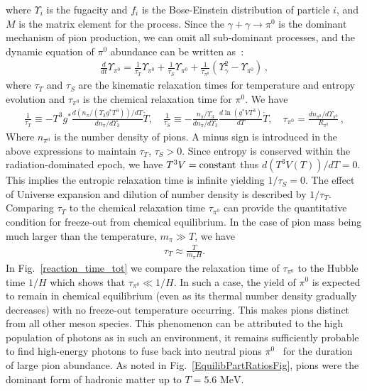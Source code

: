 \documentclass[universe,article,submit,moreauthors,pdftex,a4paper]{Definitions/mdpi}
\newcommand{\MeV}{\text{ MeV}}
\newcommand*{\rf}[1]{Fig.~{\ref{#1}}}
\begin{document}
where $\Upsilon_i$ is the fugacity and $f_{i}$ is the Bose-Einstein distribution of particle $i$, and $M$ is the matrix element for the process. Since the $\gamma+\gamma\to \pi^0$ is the dominant mechanism of pion production, we can omit all sub-dominant processes, and the dynamic equation of $\pi^0$ abundance can be written as~\cite{Fromerth:2012fe}:
\begin{align}
\frac{d}{dt}\Upsilon_{\pi^0}=\frac{1}{\tau_T}\Upsilon_{\pi^0}+\frac{1}{\tau_S}\Upsilon_{\pi^0}+\frac{1}{\tau_{\pi^0}}\left(\Upsilon^2_\gamma-\Upsilon_{\pi^0}\right)\,,
\end{align}
where $\tau_T$ and $\tau_S$ are the kinematic relaxation times for temperature and entropy evolution and $\tau_{\pi^0}$ is the chemical relaxation time for $\pi^0$. We have
\begin{align}
\frac{1}{\tau_T}\equiv -T^3g^*\frac{d (n_{\pi}/(\Upsilon_3
g^*T^3))/dT}{dn_{\pi}/d{\Upsilon_3}}{\dot T},\label{tauT} \quad
\frac{1}{\tau_{S}}\equiv
-\frac{n_{\pi}/\Upsilon_3}{dn_{\pi}/d{\Upsilon_3}}\frac{d\ln (g^*VT^3)}{dT}
\dot{T},\quad
\tau_{\pi^0}=\frac{dn_{\pi^0}/d\Upsilon_{\pi^0}}{R_{\pi^0}}\,,
\end{align}
Where $n_{\pi^0}$ is the number density of pions. A minus sign is introduced in the above expressions to maintain $\tau_T$, $\tau_S>0$. Since entropy is conserved within the radiation-dominated epoch, we have $T^{3}V={\rm constant}$ thus $d(T^3V(T))/dT=0$. This implies the entropic relaxation time is infinite yielding $1/\tau_S=0$. The effect of Universe expansion and dilution of number density is described by $1/\tau_T$. Comparing $\tau_T$ to the chemical relaxation time $\tau_{\pi^0}$ can provide the quantitative condition for freeze-out from chemical equilibrium. In the case of pion mass being much larger than the temperature, $m_{\pi}\gg T$, we have~\cite{Kuznetsova:2009xh}
\begin{align}
\tau_T\approx\frac{T}{m_{\pi}H}.
\end{align}
 In \rf{reaction_time_tot} we compare the relaxation time of $\tau_{\pi^0}$ to the Hubble time $1/H$ which shows that $\tau_{\pi^0}\ll 1/H$. In such a case, the yield of $\pi^0$ is expected to remain in chemical equilibrium (even as its thermal number density gradually decreases) with no freeze-out temperature occurring. This makes pions distinct from all other meson species. This phenomenon can be attributed to the high population of photons as in such an environment, it remains sufficiently probable to find high-energy photons to fuse back into neutral pions $\pi^0$~\cite{Fromerth:2012fe} for the duration of large pion abundance. As noted in \rf{EquilibPartRatiosFig}, pions were the dominant form of hadronic matter up to $T=5.6\MeV$.
\end{document}
